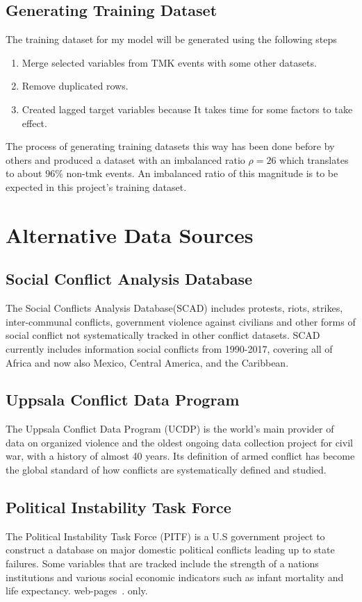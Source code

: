 \subsection{Generating Training Dataset}
The training dataset for my model will be generated using the following steps
\begin{enumerate}
  \item Merge selected variables from TMK events with some other datasets.
  \item Remove duplicated rows.
  \item Created lagged target variables because It takes time for some factors to take effect.
\end{enumerate}

The process of generating training datasets this way has been done before by others and produced a dataset with an imbalanced ratio $\rho = 26$ which translates to about 96\% non-tmk events. An imbalanced ratio of this magnitude is to be expected in this project's training dataset.

\section{Alternative Data Sources}
\subsection{Social Conflict Analysis Database}
The Social Conflicts Analysis Database(SCAD) includes protests, riots, strikes, inter-communal conflicts, government violence against civilians and other forms of social conflict not systematically tracked in other conflict datasets. SCAD currently includes information social conflicts from 1990-2017, covering all of Africa and now also Mexico, Central America, and the Caribbean.
\subsection{Uppsala Conflict Data Program}
The Uppsala Conflict Data Program (UCDP) is the world’s main provider of data on organized violence and the oldest ongoing data collection project for civil war, with a history of almost 40 years. Its definition of armed conflict has become the global standard of how conflicts are systematically defined and studied.
\subsection{Political Instability Task Force}
The Political Instability Task Force (PITF) is a U.S government project to construct a database on major domestic political conflicts leading up to state failures. Some variables that are tracked include the strength of a nations institutions and various social economic indicators such as infant mortality and life expectancy.
web-pages~\cite{Noo05}.
only.


